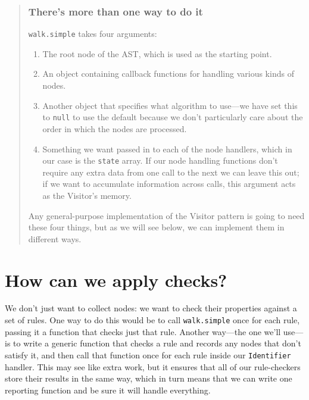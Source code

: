 \documentclass[krantzl]{krantz}
\newenvironment{callout}{\savenotes\begin{tBox}\begin{quotation}\toggletrue{inbox}\renewcommand{\thempfootnote}{\arabic{footnote}}}{\end{quotation}\vspace{\baselineskip}\end{tBox}\togglefalse{inbox}\spewnotes}
\begin{document}
\begin{callout}


\subsubsection*{There's more than one way to do it}


\texttt{walk.simple} takes four arguments:

\begin{enumerate}

\item 

The root node of the AST, which is used as the starting point.



\item 

An object containing callback functions for handling various kinds of nodes.



\item 

Another object that specifies what algorithm to use---we have set this to \texttt{null}
    to use the default because
    we don't particularly care about the order in which the nodes are processed.



\item 

Something we want passed in to each of the node handlers,
    which in our case is the \texttt{state} array.
    If our node handling functions don't require any extra data
    from one call to the next
    we can leave this out;
    if we want to accumulate information across calls,
    this argument acts as the Visitor's memory.



\end{enumerate}


Any general-purpose implementation of the Visitor pattern
is going to need these four things,
but as we will see below,
we can implement them in different ways.

\end{callout}

\section{How can we apply checks?}\label{style-checker-apply}


We don't just want to collect nodes:
we want to check their properties against a set of rules.
One way to do this would be to call \texttt{walk.simple} once for each rule,
passing it a function that checks just that rule.
Another way---the one we'll use---is to write a generic function
that checks a rule and records any nodes that don't satisfy it,
and then call that function once for each rule inside our \texttt{Identifier} handler.
This may see like extra work,
but it ensures that all of our rule-checkers store their results in the same way,
which in turn means that we can write one reporting function
and be sure it will handle everything.
\end{document}
